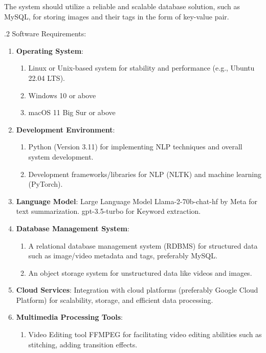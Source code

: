 \documentclass[12pt]{article}
\begin{document}
The system should utilize a reliable and scalable database solution,
such as \linebreak MySQL, for storing images and their tags in the form of key-value pair.

.2 Software Requirements:

\begin{enumerate}
\def\labelenumi{\arabic{enumi}.}
\item
  \textbf{Operating System}: 
    \begin{enumerate}
        \item Linux or Unix-based system for stability and performance (e.g., Ubuntu 22.04 LTS).
        \item Windows 10 or above
        \item macOS 11 Big Sur or above
    \end{enumerate}
\item
  \textbf{Development Environment}: 
    \begin{enumerate}
        \item Python (Version 3.11) for implementing NLP techniques and overall system development.
        \item Development frameworks/libraries for NLP (NLTK) and machine learning (PyTorch).
    \end{enumerate}
\item 
    \textbf{Language Model}: Large Language Model Llama-2-70b-chat-hf by Meta for text summarization. gpt-3.5-turbo for Keyword extraction.
\item
  \textbf{Database Management System}: 
        \begin{enumerate}
            \item A relational database management system (RDBMS) for structured data such as image/video metadata and tags, preferably MySQL.
            \item An object storage system for unstructured data like videos and images.
        \end{enumerate}
\item
  \textbf{Cloud Services}: Integration with cloud platforms (preferably Google Cloud Platform) for scalability, storage, and efficient data processing.
\item
  \textbf{Multimedia Processing Tools}:
    \begin{enumerate}
        \item Video Editing tool FFMPEG for facilitating video editing abilities such as stitching, adding transition effects.

\end{enumerate}
\end{enumerate}
\end{document}
